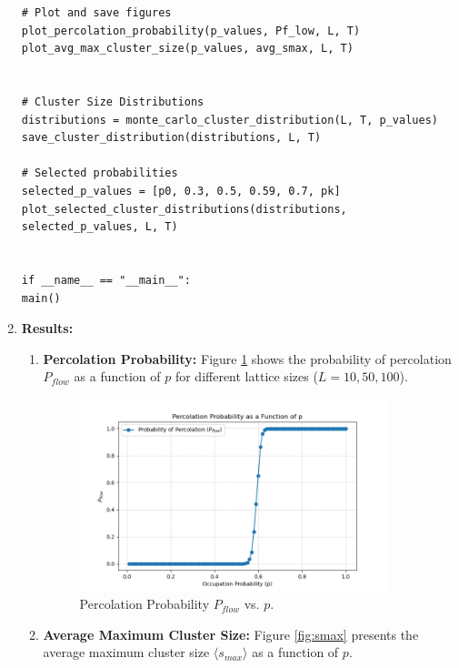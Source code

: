 \documentclass[10pt,letterpaper, onecolumn]{report}
\begin{document}
\begin{flushleft}
\begin{enumerate}
\begin{lstlisting}[style=myPythonStyle, caption={Main part of the code}]
# Plot and save figures
plot_percolation_probability(p_values, Pf_low, L, T)
plot_avg_max_cluster_size(p_values, avg_smax, L, T)


# Cluster Size Distributions
distributions = monte_carlo_cluster_distribution(L, T, p_values)
save_cluster_distribution(distributions, L, T)

# Selected probabilities
selected_p_values = [p0, 0.3, 0.5, 0.59, 0.7, pk]
plot_selected_cluster_distributions(distributions, selected_p_values, L, T)


if __name__ == "__main__":
main()

        \end{lstlisting}

        \item \textbf{Results:}
        \begin{enumerate}
            \item \textbf{Percolation Probability:}
            \hfill\break
            Figure \ref{fig:Pflow} shows the probability of percolation \( P_{flow} \) as a function of \( p \) for different lattice sizes (\( L = 10, 50, 100 \)).

            \begin{figure}[htbp!]
                \centering
                \includegraphics[width=0.9\textwidth]{../PercolationProbability-L100T1000.png}
                \caption{Percolation Probability \( P_{flow} \) vs. \( p \).}
                \label{fig:Pflow}
            \end{figure}

            \item \textbf{Average Maximum Cluster Size:}
            \hfill\break
            Figure \ref{fig:smax} presents the average maximum cluster size \( \langle s_{max} \rangle \) as a function of \( p \).


\end{enumerate}
\end{enumerate}
\end{flushleft}
\end{document}

